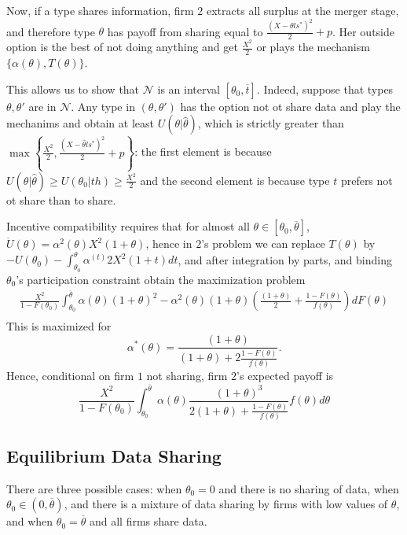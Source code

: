 \documentclass[a4paper]{article}
\newcommand{\N}{\mathcal N}
\renewcommand{\th}{\hat\theta}
\renewcommand{\t}{\theta}
\renewcommand{\a}{\alpha}
\begin{document}
Now, if a type shares information, firm $2$ extracts all surplus at the merger stage, and therefore type $\t$ has payoff from sharing equal to $\frac{(X-\t ls^*)^2}{2}+p$. Her outside option is the best of not doing anything and get $\frac{X^2}{2}$ or plays the mechanism $\{\a(\t),T(\t)\}$. 

This allows us to show that $\N$ is an interval $[\t_0,\overline t]$. Indeed, suppose that types $\t,\t'$ are in $\N$. Any type in $(\t,\t')$ has the option not ot share data and play the mechanims and obtain at least $U(\t|\th)$, which is strictly greater than $\max\left\{\frac{X^2}{2}, \frac{(X-\th ls^*)^2}{2}+p\right\}$: the first element is because $U(\t|\th)\geq U(\t_0|th)\geq \frac{X^2}{2}$ and the second element is because type $t$ prefers not ot share than to share. 

Incentive compatibility requires that for almost all $\t\in[\t_0,\overline \t]$, $\dot U(\t)=\a^2(\t) X^2(1+\t)$, hence in $2$'s problem we can replace $T(\t)$ by $-U(\t_0)-\int_{\t_0}^\t \a^(t)2 X^2(1+t)dt$, and after integration by parts, and binding $\t_0$'s participation constraint obtain the maximization problem
%
\begin{equation}
\begin{aligned}
    \frac{X^2}{1-F(\t_0)}\int_{\t_0}^{\overline \t}\a(\t) (1+\t)^2-\a^2(\t)(1+\t)\left(\frac{(1+\t)}{2}+\frac{1-F(\t)}{f(\t)}\right) dF(\t)\\
\end{aligned}
\end{equation}
This is maximized for 
%
\begin{equation}
    \a^*(\t)=\frac{(1+\t)}{(1+\t)+2 \frac{1-F(\t)}{f(\t)}}.
\end{equation}
%
Hence, conditional on firm $1$ not sharing, firm $2$'s expected payoff is 
%
\[
   \frac{X^2}{1-F(\t_0)}\int_{\t_0}^{\overline \t}\a(\t) \frac{(1+\t)^3}{2(1+\t)+\frac{1-F(\t)}{f(\t)}}f(\t)d\t
\]
%



\subsection*{Equilibrium Data Sharing}
There are three possible cases: when $\t_0=0$ and there is no sharing of data, when $\t_0\in(0,\overline \t)$, and there is a mixture of data sharing by firms with low values of $\t$, and when $\t_0=\overline \t$ and all firms share data.
\end{document}
